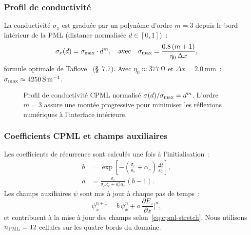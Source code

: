 \documentclass[12pt,a4paper]{article}
\newcommand{\Ez}{{E_z}}
\newcommand{\epso}{\varepsilon_0}
\newcommand{\etao}{\eta_0}
\newcommand{\dx}{\Delta x}
\newcommand{\dt}{\Delta t}
\begin{document}
\subsubsection{Profil de conductivité}

La conductivité $\sigma_x$ est graduée par un polynôme d'ordre $m=3$ depuis le bord
intérieur de la PML (distance normalisée $d \in [0,1]$)~:
\begin{equation}
    \sigma_x(d) = \sigma_{\rm max} \cdot d^m, \quad \text{avec} \quad
    \sigma_{\rm max} = \frac{0.8\,(m+1)}{\etao\,\dx},
    \label{eq:cpml-sigma}
\end{equation}
formule optimale de Taflove~\cite{Taflove2005} (\S~7.7). Avec $\etao \approx \SI{377}{\ohm}$
et $\dx = \SI{2.0}{\milli\metre}$~:
$\sigma_{\rm max} \approx \SI{4250}{\siemens\per\metre}$.

\begin{figure}[htbp]
\centering
{}
\caption{Profil de conductivité CPML normalisé $\sigma(d)/\sigma_{\rm max} = d^m$.
L'ordre $m=3$ assure une montée progressive pour minimiser les réflexions numériques
à l'interface intérieure.}
\label{fig:cpml-profile}
\end{figure}

\subsubsection{Coefficients CPML et champs auxiliaires}

Les coefficients de récurrence sont calculés une fois à l'initialisation~:
\begin{align}
    b &= \exp\!\left[-\!\left(\frac{\sigma_e}{\kappa_e} + \alpha_e\right)
        \frac{\dt}{\epso}\right], \label{eq:cpml-b}\\
    a &= \frac{\sigma_e}{\sigma_e\kappa_e + \kappa_e^2\alpha_e}(b-1).
        \label{eq:cpml-a}
\end{align}
Les champs auxiliaires $\psi$ sont mis à jour à chaque pas de temps~:
\begin{equation}
    \psi^{n+1}_{x} = b\,\psi^{n}_{x} + a\,\frac{\partial \Ez}{\partial x}\bigg|^n,
    \label{eq:cpml-psi}
\end{equation}
et contribuent à la mise à jour des champs selon~\eqref{eq:cpml-stretch}.
Nous utilisons $n_{\rm PML} = 12$ cellules sur les quatre bords du domaine.
\end{document}
